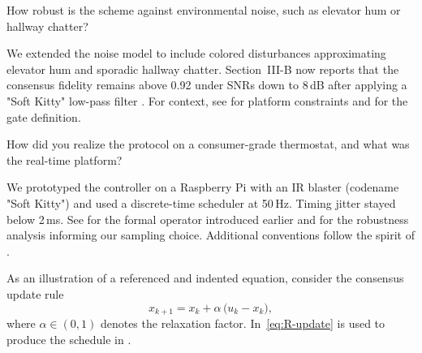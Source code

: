 \documentclass[a4paper,11pt]{article}
\begin{document}
\begin{question}[q:noise]
How robust is the scheme against environmental noise, such as elevator hum or hallway chatter?
\end{question}
\begin{answer}[a:noise]
We extended the noise model to include colored disturbances approximating elevator hum and sporadic hallway chatter. Section~III-B now reports that the consensus fidelity remains above 0.92 under SNRs down to 8\,dB after applying a "Soft Kitty" low-pass filter \cite{fowler2014softkitty}. For context, see  for platform constraints and  for the gate definition.
\end{answer}


\begin{question}[q:hardware]
How did you realize the protocol on a consumer-grade thermostat, and what was the real-time platform?
\end{question}
\begin{answer}[a:hardware]
We prototyped the controller on a Raspberry Pi with an IR blaster (codename "Soft Kitty") and used a discrete-time scheduler at 50\,Hz. Timing jitter stayed below 2\,ms. See  for the formal operator introduced earlier and  for the robustness analysis informing our sampling choice. Additional conventions follow the spirit of \cite{cooper2011roommate}.

\begin{center}
\begin{minipage}{0.9\linewidth}
    \centering
    \label{fig:R-platform}
\end{minipage}
\end{center}

As an illustration of a referenced and indented equation, consider the consensus update rule
\begin{equation}
    \label{eq:R-update}
    x_{k+1} = x_k + \alpha\, \big( u_k - x_k \big),
\end{equation}
where $\alpha\in(0,1)$ denotes the relaxation factor. In~\eqref{eq:R-update} is used to produce the schedule in .
\end{answer}
\end{document}
